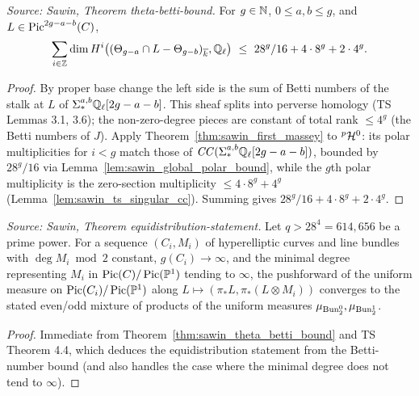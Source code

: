 \begin{theorem}
  \label{thm:sawin_theta_betti_bound}
  \textit{Source: Sawin, Theorem theta-betti-bound.}
  For $g\in\mathbb{N}$, $0\le a,b\le g$, and $L\in\operatorname{Pic}^{2g-a-b}(C)$,
  \[ \sum_{i\in\mathbb{Z}}\dim H^i\bigl((\Theta_{g-a}\cap L-\Theta_{g-b})_{\overline k},\mathbb{Q}_\ell\bigr)
     \ \le\ 28^g/16 + 4\cdot 8^g + 2\cdot 4^g. \]
\end{theorem}
\begin{proof}
  By proper base change the left side is the sum of Betti numbers of the stalk at
  $L$ of $\Sigma^{a,b}_*\mathbb{Q}_\ell[2g-a-b]$.  This sheaf splits into perverse
  homology (TS Lemmas 3.1, 3.6); the non-zero-degree pieces are constant of total
  rank $\le 4^g$ (the Betti numbers of $J$).  Apply
  Theorem~\ref{thm:sawin_first_massey} to ${}^p\mathcal{H}^0$: its polar multiplicities for
  $i<g$ match those of $\mathit{CC}(\Sigma^{a,b}_*\mathbb{Q}_\ell[2g-a-b])$, bounded by
  $28^g/16$ via Lemma~\ref{lem:sawin_global_polar_bound}, while the $g$th polar
  multiplicity is the zero-section multiplicity $\le 4\cdot 8^g + 4^g$
  (Lemma~\ref{lem:sawin_ts_singular_cc}).  Summing gives
  $28^g/16 + 4\cdot 8^g + 2\cdot 4^g$.
\end{proof}

\begin{theorem}
  \label{thm:sawin_equidistribution}
  \textit{Source: Sawin, Theorem equidistribution-statement.}
  Let $q>28^4=614{,}656$ be a prime power.  For a sequence $(C_i,M_i)$ of
  hyperelliptic curves and line bundles with $\deg M_i\bmod 2$ constant,
  $g(C_i)\to\infty$, and the minimal degree representing $M_i$ in
  $\operatorname{Pic}(C)/\operatorname{Pic}(\mathbb{P}^1)$ tending to $\infty$, the pushforward of the uniform
  measure on $\operatorname{Pic}(C_i)/\operatorname{Pic}(\mathbb{P}^1)$ along $L\mapsto(\pi_*L,\pi_*(L\otimes M_i))$
  converges to the stated even/odd mixture of products of the uniform measures
  $\mu_{\operatorname{Bun}_2^0},\mu_{\operatorname{Bun}_2^1}$.
\end{theorem}
\begin{proof}
  Immediate from Theorem~\ref{thm:sawin_theta_betti_bound} and TS Theorem 4.4,
  which deduces the equidistribution statement from the Betti-number bound (and
  also handles the case where the minimal degree does not tend to $\infty$).
\end{proof}

